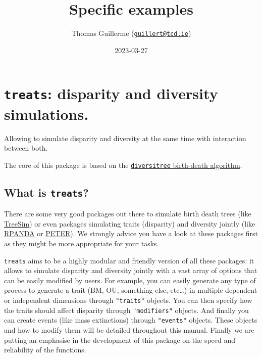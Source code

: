 \documentclass[
]{book}
\title{Specific examples}
\author{Thomas Guillerme (\href{mailto:guillert@tcd.ie}{\nolinkurl{guillert@tcd.ie}})}
\date{2023-03-27}
\begin{document}
\maketitle

{
\setcounter{tocdepth}{1}
\tableofcontents
}
\hypertarget{treats-disparity-and-diversity-simulations.}{%
\chapter{\texorpdfstring{\texttt{treats}: disparity and diversity simulations.}{treats: disparity and diversity simulations.}}\label{treats-disparity-and-diversity-simulations.}}

Allowing to simulate disparity and diversity at the same time with interaction between both.

The core of this package is based on the \href{https://github.com/cran/diversitree/blob/master/R/simulate-bd.R}{\texttt{diversitree} birth-death algorithm}.

\hypertarget{what-is-treats}{%
\section{\texorpdfstring{What is \texttt{treats}?}{What is treats?}}\label{what-is-treats}}

There are some very good packages out there to simulate birth death trees (like \href{https://github.com/tanja819/TreeSim}{TreeSim}) or even packages simulating traits (disparity) and diversity jointly (like \href{https://github.com/cran/RPANDA}{RPANDA} or \href{https://github.com/PuttickMacroevolution/PETER}{PETER}).
We strongly advice you have a look at these packages first as they might be more appropriate for your tasks.

\texttt{treats} aims to be a highly modular and friendly version of all these packages: it allows to simulate disparity and diversity jointly with a vast array of options that can be easily modified by users.
For example, you can easily generate any type of process to generate a trait (BM, OU, something else, etc\ldots) in multiple dependent or independent dimensions through \texttt{"traits"} objects.
You can then specify how the traits should affect disparity through \texttt{"modifiers"} objects. And finally you can create events (like mass extinctions) through \texttt{"events"} objects.
These objects and how to modify them will be detailed throughout this manual.
Finally we are putting an emphasise in the development of this package on the speed and reliability of the functions.
\end{document}
